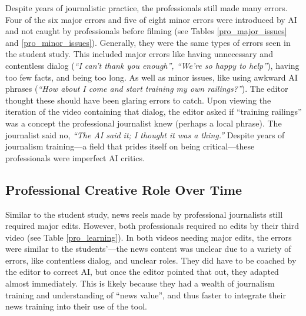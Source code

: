Despite years of journalistic practice, the professionals still made many errors. 
Four of the six major errors and five of eight minor errors were introduced by AI and not caught by professionals before filming (see Tables \ref{pro_major_issues} and \ref{pro_minor_issues}). 
Generally, they were the same types of errors seen in the student study. 
This included major errors like having unnecessary and contentless dialog (\textit{``I can't thank you enough'', ``We're so happy to help''}), having too few facts, and being too long.  
As well as minor issues, like using awkward AI phrases (\textit{``How about I come and start training my own railings?''}). 
The editor thought these should have been glaring errors to catch. 
Upon viewing the iteration of the video containing that dialog, the editor asked if ``training railings'' was a concept the professional journalist knew (perhaps a local phrase). 
The journalist said no, \textit{``The AI said it; I thought it was a thing.''} 
Despite years of journalism training---a field that prides itself on being critical---these professionals were imperfect AI critics.

\subsection{Professional Creative Role Over Time}
Similar to the student study, news reels made by professional journalists still required major edits. 
However, both professionals required no edits by their third video (see Table \ref{pro_learning}). 
In both videos needing major edits, the errors were similar to the students'---the news content was unclear due to a variety of errors, like contentless dialog, and unclear roles. 
They did have to be coached by the editor to correct AI, but once the editor pointed that out, they adapted almost immediately. 
This is likely because they had a wealth of journalism training and understanding of ``news value'', and thus faster to integrate their news training into their use of the tool. 



